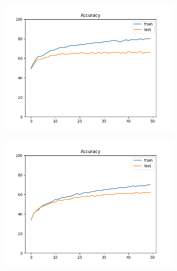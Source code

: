 \documentclass[12pt]{article}
\begin{document}
\begin{figure}
\begin{subfigure}{0.19\textwidth}
  \end{subfigure}
  \begin{subfigure}{0.19\textwidth}
    \centering
    \includegraphics[width=\linewidth]{accuracies_2_3_bs4.png}
  \end{subfigure}
  \begin{subfigure}{0.19\textwidth}
    \centering
    \includegraphics[width=\linewidth]{accuracies_3_lr1e-4.png}
  \end{subfigure}


\end{figure}
\end{document}
